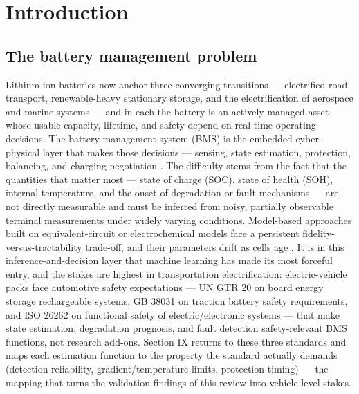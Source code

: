 \documentclass[journal]{IEEEtran}
\begin{document}
\section{Introduction}

\subsection{The battery management problem}

Lithium-ion batteries now anchor three converging transitions --- electrified road transport, renewable-heavy stationary storage, and the electrification of aerospace and marine systems --- and in each the battery is an actively managed asset whose usable capacity, lifetime, and safety depend on real-time operating decisions. The battery management system (BMS) is the embedded cyber-physical layer that makes those decisions --- sensing, state estimation, protection, balancing, and charging negotiation \cite{r1}. The difficulty stems from the fact that the quantities that matter most --- state of charge (SOC), state of health (SOH), internal temperature, and the onset of degradation or fault mechanisms --- are not directly measurable and must be inferred from noisy, partially observable terminal measurements under widely varying conditions. Model-based approaches built on equivalent-circuit or electrochemical models face a persistent fidelity-versus-tractability trade-off, and their parameters drift as cells age \cite{r2}. It is in this inference-and-decision layer that machine learning has made its most forceful entry, and the stakes are highest in transportation electrification: electric-vehicle packs face automotive safety expectations --- UN GTR 20 on board energy storage rechargeable systems, GB 38031 on traction battery safety requirements, and ISO 26262 on functional safety of electric/electronic systems --- that make state estimation, degradation prognosis, and fault detection safety-relevant BMS functions, not research add-ons. Section IX returns to these three standards and maps each estimation function to the property the standard actually demands (detection reliability, gradient/temperature limits, protection timing) --- the mapping that turns the validation findings of this review into vehicle-level stakes.
\end{document}

